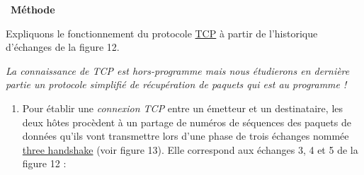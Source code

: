 \documentclass[
  11pt,
]{article}
\newcounter{def}
\newcounter{prog}
\newenvironment{methode}[1]
{\par \medskip    \noindent  
 \begin {bclogo}[arrondi =0.1,logo=\bcoutil, marge=4,noborder = true] {~\textbf{Méthode}   {\itshape #1} }  \par}
{
\end{bclogo}
 \par \bigskip }
\newcounter{histo}
\begin{document}
\begin{methode}{}

Expliquons le fonctionnement du protocole
\href{https://fr.wikipedia.org/wiki/Transmission_Control_Protocol}{TCP}
à partir de l'historique d'échanges de la figure 12.

\emph{La connaissance de TCP est hors-programme mais nous étudierons en
dernière partie un protocole simplifié de récupération de paquets qui
est au programme !}

\begin{enumerate}
\def\labelenumi{\arabic{enumi}.}
\item
  Pour établir une \emph{connexion TCP} entre un émetteur et un
  destinataire, les deux hôtes procèdent à un partage de numéros de
  séquences des paquets de données qu'ils vont transmettre lors d'une
  phase de trois échanges nommée
  \href{https://fr.wikipedia.org/wiki/Three-way_handshake}{three
  handshake} (voir figure 13). Elle correspond aux échanges 3, 4 et 5 de
  la figure 12 :


\end{enumerate}
\end{methode}
\end{document}
